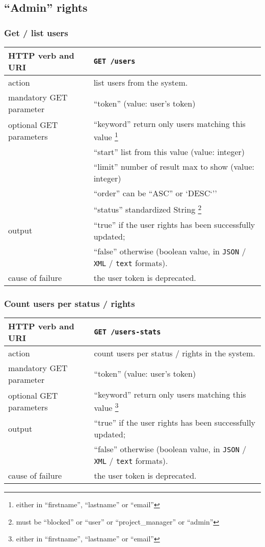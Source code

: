 \subsection{``Admin'' rights}

\subsubsection{Get / list users}
\begin{tabular}{ | l | l | }
	\hline
	HTTP verb and URI & \texttt{GET /users} \\
	\hline
	action & list users from the system. \\
	\hline
	mandatory GET parameter & ``token'' (value: user's token) \\
	\hline
	optional GET parameters & ``keyword'' return only users matching this value \footnote{either in ``firstname'', ``lastname'' or ``email''} \\
	\space & ``start'' list from this value (value: integer) \\
	\space & ``limit'' number of result max to show (value: integer) \\
	\space & ``order'' can be ``ASC'' or `DESC`'' \\
	\space &  ``status'' standardized String \footnote{must be ``blocked'' or ``user'' or ``project\_manager'' or ``admin''} \\		
	\hline
	output & ``true'' if the user rights has been successfully updated; \\
	\space & ``false'' otherwise (boolean value, in \texttt{JSON} / \texttt{XML} / \texttt{text} formats). \\
	\hline
	cause of failure & the user token is deprecated. \\
	\hline
\end{tabular}
\newline

\subsubsection{Count users per status / rights}
\begin{tabular}{ | l | l | }
	\hline
	HTTP verb and URI & \texttt{GET /users-stats} \\
	\hline
	action & count users per status / rights in the system. \\
	\hline
	mandatory GET parameter & ``token'' (value: user's token) \\
	\hline
	optional GET parameters & ``keyword'' return only users matching this value \footnote{either in ``firstname'', ``lastname'' or ``email''} \\	
	\hline
	output & ``true'' if the user rights has been successfully updated; \\
	\space & ``false'' otherwise (boolean value, in \texttt{JSON} / \texttt{XML} / \texttt{text} formats). \\
	\hline
	cause of failure & the user token is deprecated. \\
	\hline
\end{tabular}
\newline

